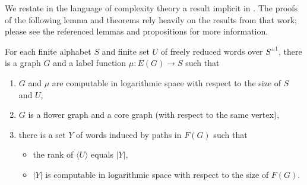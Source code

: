 \documentclass{article}
\newcommand{\gen}[1]{\langle #1 \rangle}
\newcommand{\Spm}{S^{\pm1}}
\begin{document}
We restate in the language of complexity theory a result implicit in \cite{km02}.
The proofs of the following lemma and theorems rely heavily on the results from that work; please see the referenced lemmas and propositions for more information.

\begin{lemma}\label{lem:main}
  For each finite alphabet $S$ and finite set $U$ of freely reduced words over $\Spm$, there is a graph $G$ and a label function $\mu \colon E(G) \to S$ such that
  \begin{enumerate}
  \item $G$ and $\mu$ are computable in logarithmic space with respect to the size of $S$ and $U$,
  \item $G$ is a flower graph and a core graph (with respect to the same vertex),
  \item there is a set $Y$ of words induced by paths in $F(G)$ such that
    \begin{itemize}
    \item the rank of $\gen{U}$ equals $|Y|$,
    \item $|Y|$ is computable in logarithmic space with respect to the size of $F(G)$.
    \end{itemize}
  \end{enumerate}
\end{lemma}
\end{document}
